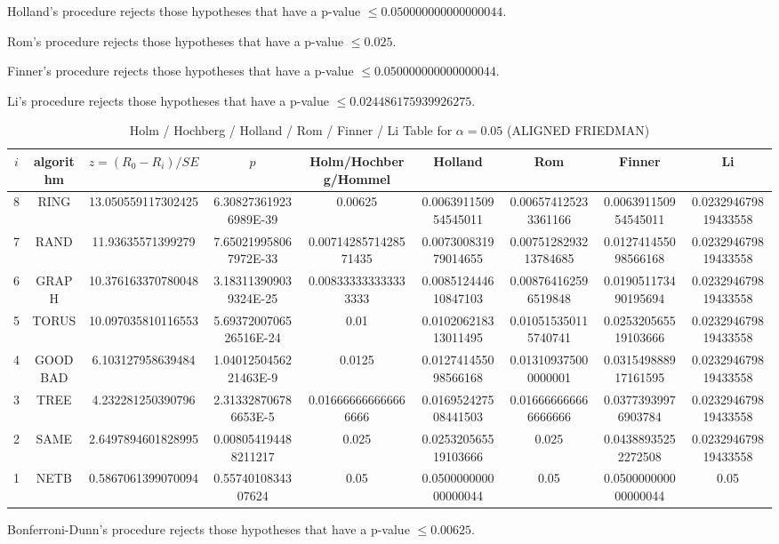 \documentclass[a4paper,10pt]{article}
\begin{document}
\begin{landscape}
Holland's procedure rejects those hypotheses that have a p-value $\le0.050000000000000044$.


Rom's procedure rejects those hypotheses that have a p-value $\le0.025$.


Finner's procedure rejects those hypotheses that have a p-value $\le0.050000000000000044$.


Li's procedure rejects those hypotheses that have a p-value $\le0.024486175939926275$.



\newpage

\begin{table}[!htp]
\centering\scriptsize
\caption{Holm / Hochberg / Holland / Rom / Finner / Li Table for $\alpha=0.05$ (ALIGNED FRIEDMAN)}
\begin{tabular}{ccccccccc}
$i$&algorithm&$z=(R_0 - R_i)/SE$&$p$&Holm/Hochberg/Hommel&Holland&Rom&Finner&Li\\
\hline
8& RING&13.050559117302425&6.308273619236989E-39&0.00625&0.006391150954545011&0.006574125233361166&0.006391150954545011&0.023294679819433558\\
7& RAND&11.93635571399279&7.650219958067972E-33&0.0071428571428571435&0.007300831979014655&0.0075128293213784685&0.012741455098566168&0.023294679819433558\\
6& GRAPH&10.376163370780048&3.183113909039324E-25&0.008333333333333333&0.008512444610847103&0.008764162596519848&0.019051173490195694&0.023294679819433558\\
5& TORUS&10.097035810116553&5.6937200706526516E-24&0.01&0.010206218313011495&0.010515350115740741&0.025320565519103666&0.023294679819433558\\
4& GOODBAD&6.103127958639484&1.0401250456221463E-9&0.0125&0.012741455098566168&0.013109375000000001&0.031549888917161595&0.023294679819433558\\
3& TREE&4.232281250390796&2.313328706786653E-5&0.016666666666666666&0.016952427508441503&0.016666666666666666&0.03773939976903784&0.023294679819433558\\
2& SAME&2.6497894601828995&0.008054194488211217&0.025&0.025320565519103666&0.025&0.04388935252272508&0.023294679819433558\\
1& NETB&0.5867061399070094&0.5574010834307624&0.05&0.050000000000000044&0.05&0.050000000000000044&0.05\\
\hline
\end{tabular}
\end{table}
Bonferroni-Dunn's procedure rejects those hypotheses that have a p-value $\le0.00625$.



\end{landscape}
\end{document}
